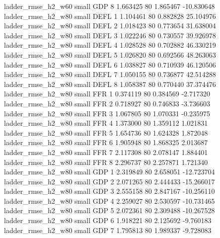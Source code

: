      ladder_rmse_h2_w60      small      GDP                 8 1.663425 80       1.865467         -10.830648
      ladder_rmse_h2_w80      small     DEFL                 1 1.104461 80       0.882828          25.104976
      ladder_rmse_h2_w80      small     DEFL                 2 1.018423 80       0.773654          31.638004
      ladder_rmse_h2_w80      small     DEFL                 3 1.022246 80       0.730557          39.926978
      ladder_rmse_h2_w80      small     DEFL                 4 1.028528 80       0.702882          46.330219
      ladder_rmse_h2_w80      small     DEFL                 5 1.026820 80       0.692566          48.263063
      ladder_rmse_h2_w80      small     DEFL                 6 1.038827 80       0.710939          46.120506
      ladder_rmse_h2_w80      small     DEFL                 7 1.050155 80       0.736877          42.514288
      ladder_rmse_h2_w80      small     DEFL                 8 1.058387 80       0.770440          37.374476
      ladder_rmse_h2_w80      small      FFR                 1 0.374119 80       0.384569          -2.717320
      ladder_rmse_h2_w80      small      FFR                 2 0.718927 80       0.746833          -3.736603
      ladder_rmse_h2_w80      small      FFR                 3 1.067805 80       1.070331          -0.235975
      ladder_rmse_h2_w80      small      FFR                 4 1.373000 80       1.359112           1.021831
      ladder_rmse_h2_w80      small      FFR                 5 1.654736 80       1.624328           1.872048
      ladder_rmse_h2_w80      small      FFR                 6 1.905948 80       1.868325           2.013687
      ladder_rmse_h2_w80      small      FFR                 7 2.117308 80       2.078147           1.884401
      ladder_rmse_h2_w80      small      FFR                 8 2.296737 80       2.257871           1.721340
      ladder_rmse_h2_w80      small      GDP                 1 2.319849 80       2.658051         -12.723704
      ladder_rmse_h2_w80      small      GDP                 2 2.071265 80       2.444433         -15.266017
      ladder_rmse_h2_w80      small      GDP                 3 2.555158 80       2.847167         -10.256110
      ladder_rmse_h2_w80      small      GDP                 4 2.259027 80       2.530597         -10.731465
      ladder_rmse_h2_w80      small      GDP                 5 2.072361 80       2.309488         -10.267528
      ladder_rmse_h2_w80      small      GDP                 6 1.918221 80       2.125692          -9.760183
      ladder_rmse_h2_w80      small      GDP                 7 1.795813 80       1.989337          -9.728083
